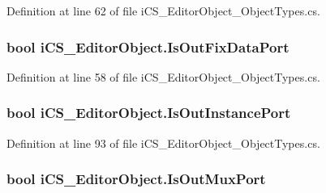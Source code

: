 Definition at line 62 of file i\+C\+S\+\_\+\+Editor\+Object\+\_\+\+Object\+Types.\+cs.

\hypertarget{classi_c_s___editor_object_a41f284cf80c06a3a69bb45feb3617ffe}{
\subsubsection[{Is\+Out\+Fix\+Data\+Port}]{\setlength{\rightskip}{0pt plus 5cm}bool i\+C\+S\+\_\+\+Editor\+Object.\+Is\+Out\+Fix\+Data\+Port\hspace{0.3cm}{\ttfamily [get]}}}\label{classi_c_s___editor_object_a41f284cf80c06a3a69bb45feb3617ffe}


Definition at line 58 of file i\+C\+S\+\_\+\+Editor\+Object\+\_\+\+Object\+Types.\+cs.

\hypertarget{classi_c_s___editor_object_af31d10e62033b487a792e18c8f52aa16}{
\subsubsection[{Is\+Out\+Instance\+Port}]{\setlength{\rightskip}{0pt plus 5cm}bool i\+C\+S\+\_\+\+Editor\+Object.\+Is\+Out\+Instance\+Port\hspace{0.3cm}{\ttfamily [get]}}}\label{classi_c_s___editor_object_af31d10e62033b487a792e18c8f52aa16}


Definition at line 93 of file i\+C\+S\+\_\+\+Editor\+Object\+\_\+\+Object\+Types.\+cs.

\hypertarget{classi_c_s___editor_object_a4f1ff9e8a20f8966a814091ef3abca03}{
\subsubsection[{Is\+Out\+Mux\+Port}]{\setlength{\rightskip}{0pt plus 5cm}bool i\+C\+S\+\_\+\+Editor\+Object.\+Is\+Out\+Mux\+Port\hspace{0.3cm}{\ttfamily [get]}}}\label{classi_c_s___editor_object_a4f1ff9e8a20f8966a814091ef3abca03}


